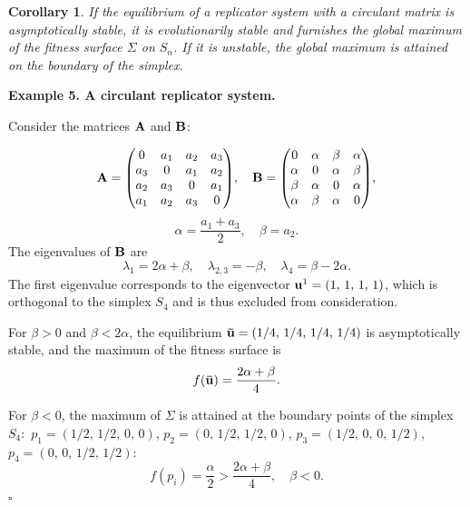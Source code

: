 \documentclass[12pt]{report}
\newtheorem{conseq}[theorem]{Corollary}
\theoremstyle{definition}
\theoremstyle{remark}
\begin{document}
\begin{conseq}\label{c2:conseq2.2} \cite{c2:Drozhzhin2021} 
	If the equilibrium of a replicator system with a circulant matrix is asymptotically stable, it is evolutionarily stable and furnishes the global maximum of the fitness surface $\Sigma$ on $S_{n}$. If it is unstable, the global maximum is attained on the boundary of the simplex.
\end{conseq}

\medskip
\textbf{Example 5. A circulant replicator system.}

Consider the matrices ${\bf A}$ and ${\bf B}$:

\begin{equation*}
	{\bf A} = 
	\begin{pmatrix}
		0 & a_{1} & a_{2} & a_{3}\\
		a_{3} & 0 & a_{1} & a_{2}\\
		a_{2} & a_{3} & 0 & a_{1}\\
		a_{1} & a_{2} & a_{3} & 0\\
	\end{pmatrix}\!,
	\quad
	{\bf B} = 
	\begin{pmatrix}
		0 & \alpha & \beta & \alpha\\
		\alpha & 0 & \alpha & \beta\\
		\beta & \alpha & 0 & \alpha\\
		\alpha & \beta & \alpha & 0\\
	\end{pmatrix}\!, 
\end{equation*} 
$$	\alpha = \frac{a_{1} + a_{3}}{2}, \quad \beta = a_{2}.
$$
The eigenvalues of ${\bf B}$ are
$$
\lambda_{1} = 2\alpha + \beta, \quad \lambda_{2, 3} = -\beta, \quad \lambda_{4} = \beta - 2\alpha.
$$
The first eigenvalue corresponds to the eigenvector ${\bf u}^{1} = (1,\, 1,\, 1,\, 1)$, which is orthogonal to the simplex $S_{4}$ and is thus excluded from consideration.

For $\beta > 0$ and $\beta < 2\alpha$, the equilibrium ${\bf \bar{u}} = (1/4,\, 1/4,\, 1/4,\, 1/4)$ is asymptotically stable, and the maximum of the fitness surface is
$$
f({\bf \bar{u}}) = \frac{2\alpha + \beta}{4}.
$$

For $\beta < 0$, the maximum of $\Sigma$ is attained at the boundary points of the simplex $S_{4}$:\, $p_{1} = (1/2,\, 1/2,\, 0,\, 0)$, $p_{2} = (0,\, 1/2,\, 1/2,\, 0)$, $p_{3} = (1/2,\, 0,\, 0,\, 1/2)$, $p_{4} = (0,\, 0,\, 1/2,\, 1/2)$:
$$
f(p_{i}) = \frac{\alpha}{2} > \frac{2\alpha + \beta}{4}, \quad \beta < 0.
$$
\hfill$\square$
\end{document}
